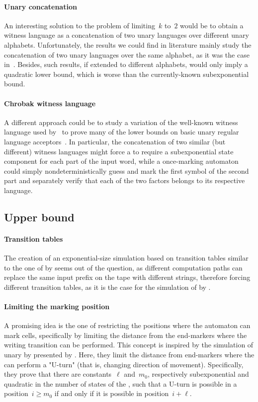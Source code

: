 \paragraph{Unary concatenation} An interesting solution to the problem of limiting~$k$ to~$2$ would be to obtain a witness language as a concatenation of two unary languages over different unary alphabets.
Unfortunately, the results we could find in literature mainly study the concatenation of two unary languages over the same alphabet, as it was the case in~\cite{YuZhu+94,PigSha02}.
Besides, such results, if extended to different alphabets, would only imply a quadratic lower bound, which is worse than the currently-known subexponential bound.

\paragraph{Chrobak witness language} A different approach could be to study a variation of the well-known witness language used by~\citeauthor{Chr86} to prove many of the lower bounds on basic unary regular language acceptors~\cite{Chr86}.
In particular, the concatenation of two similar (but different) witness languages might force a \ODFA to require a subexponential state component for each part of the input word, while a once-marking automaton could simply nondeterministically guess and mark the first symbol of the second part and separately verify that each of the two factors belongs to its respective language.


\subsection{Upper bound}

\paragraph{Transition tables} The creation of an exponential-size simulation based on transition tables similar to the one of \TNFAs by \ODFAs seems out of the question, as different computation paths can replace the same input prefix on the tape with different strings, therefore forcing different transition tables, as it is the case for the simulation of \OLAs by \ODFAs.

\paragraph{Limiting the marking position} A promising idea is the one of restricting the positions where the automaton can mark cells, specifically by limiting the distance from the end-markers where the writing transition can be performed.
This concept is inspired by the simulation of unary \TNFAs by \ODFAs presented by .
Here, they limit the distance from end-markers where the \TNFA can perform a "U-turn" (that is, changing direction of movement).
Specifically, they prove that there are constants~$\ell$ and~$m_0$, respectively subexponential and quadratic in the number of states of the \TNFA, such that a U-turn is possible in a position~$i\ge m_0$ if and only if it is possible in position~$i+\ell$.

